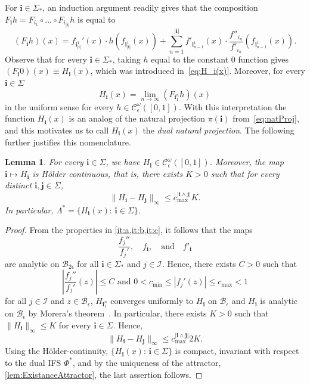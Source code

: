 \documentclass[11pt,a4paper]{article}
\def\cref#1{\ref{#1}}%
\newtheorem{lemma}[theorem]{Lemma}
\theoremstyle{definition}
\theoremstyle{remark}
\newcommand{\0}{\mathbf{0}}
\newcommand{\bi}{\mathbf{i}}
\newcommand{\bj}{\mathbf{j}}
\numberwithin{equation}{section}
\begin{document}
For $\bi\in\Sigma_*$, an induction argument readily gives that the composition
$F_{\bi}h=F_{i_1}\circ\ldots\circ F_{i_{|\bi|}}h$ is equal to
\begin{equation*}%
	(F_{\bi}h)(x) = f_{\bi_{|\bi|}^1}'(x)\cdot h(f_{\bi_{|\bi|}^1}(x)) + \sum_{n=1}^{|\bi|}
	f'_{\bi_{n-1}^1}(x) \cdot 
	\frac{f''_{i_n}}{f'_{i_n}}(f_{\bi_{n-1}^1}(x)).
\end{equation*}
Observe that for every $\bi\in\Sigma_*$, taking $h$ equal to the constant $0$ function gives
$(F_{\bi}0)(x)\equiv H_{\bi}(x)$, which was introduced
in~\cref{eq:H_i(x)}. Moreover, for every $\bi\in\Sigma$
\begin{equation*}%
	H_{\bi}(x)=\lim_{n\to\infty}(F_{\bi_1^n}h)(x)
\end{equation*}
in the uniform sense for every $h\in\mathcal{C}_\epsilon^\omega([0,1])$. With this interpretation
the function $H_{\bi}(x)$ is an analog of the natural projection $\pi(\bi)$ from~\cref{eq:natProj},
and this motivates us to call $H_{\bi}(x)$ the \emph{dual natural projection}. The following 
further justifies this nomenclature.
\begin{lemma}\label{thm:H_iAnalytic}
	For every $\bi\in\Sigma$, we have $H_{\bi}\in\mathcal{C}_\epsilon^{\omega}([0,1])$.
	Moreover, the map $\bi\mapsto H_{\bi}$ is H\"older continuous, that is, there exists $K>0$
	such that for every distinct $\bi,\bj\in\Sigma$,
	\begin{equation*}%
		\|H_{\bi}-H_{\bj}\|_\infty\leq c_{\max}^{|\bi\wedge\bj|}K.
	\end{equation*}
	In particular, $\Lambda^*=\{H_{\bi}(x):\, \bi\in\Sigma\}$.
\end{lemma}

\begin{proof}
 From the properties in \cref{it:a,it:b,it:c}, it follows that the maps
 \[
 \frac{f_j''}{f_j'},\quad f_{\bi}, \quad\text{and} \quad f'_{\bi}
 \]
 are analytic on $\mathcal{B}_{2\epsilon}$ for all $\bi\in\Sigma_*$ and $j\in\mathcal{I}$. Hence,
 there exists $C>0$ such that
 \[
   \left|\frac{f_j''}{f_j'}(z)\right| \leq C\text{ and }0<c_{\min}\leq|f_j'(z)|\leq c_{\max}<1
 \]
 for all $j\in\mathcal{I}$ and $z\in\mathcal{B}_{\epsilon}$, $H_{\bi_1^n}$ converges
 uniformly to $H_{\bi}$ on $\mathcal{B}_{\epsilon}$ and $H_{\bi}$ is analytic on
 $\mathcal{B}_{\epsilon}$ by Morera's theorem~\cite[Theorem 10.17]{Rudin_AnalysisBook}. In
 particular, there exists $K>0$ such that $\|H_{\bi}\|_\infty\leq K$ for every
 $\bi\in\Sigma$. Hence, $$
 \|H_{\bi}-H_{\bj}\|_\infty\leq c_{\max}^{|\bi\wedge\bj|}2K.
 $$
 Using the H\"older-continuity, $\{H_{\bi}(x):\, \bi\in\Sigma\}$ is compact, invariant with
 respect to the dual IFS $\Phi^*$, and by the uniqueness of the attractor,
 \cref{lem:ExistanceAttractor}, the last assertion follows.
\end{proof}
\end{document}
